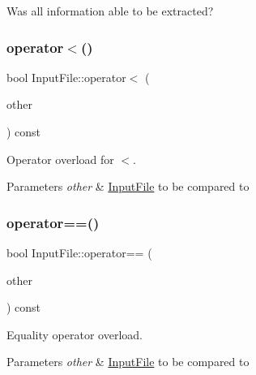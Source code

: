 Was all information able to be extracted? 

\mbox{\label{class_input_file_a8c7c438538b8b183454632c27a55f701}} 
\subsubsection{\texorpdfstring{operator$<$()}{operator<()}}
{\footnotesize\ttfamily bool Input\+File\+::operator$<$ (\begin{DoxyParamCaption}\item[{const \hyperlink{class_input_file}{Input\+File} \&}]{other }\end{DoxyParamCaption}) const}



Operator overload for $<$. 


\begin{DoxyParams}{Parameters}
{\em other} & \hyperlink{class_input_file}{Input\+File} to be compared to \\
\hline
\end{DoxyParams}
\mbox{\label{class_input_file_aba80d895922ad25de1bdd7724d35755a}} 
\subsubsection{\texorpdfstring{operator==()}{operator==()}}
{\footnotesize\ttfamily bool Input\+File\+::operator== (\begin{DoxyParamCaption}\item[{const \hyperlink{class_input_file}{Input\+File} \&}]{other }\end{DoxyParamCaption}) const}



Equality operator overload. 


\begin{DoxyParams}{Parameters}
{\em other} & \hyperlink{class_input_file}{Input\+File} to be compared to \\
\hline
\end{DoxyParams}
\mbox{\label{class_input_file_a4bf7efae68f3f378d1d4d1565fce8081}} 
